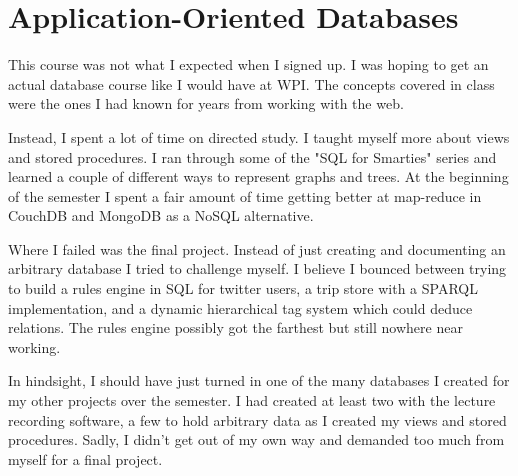 \section{Application-Oriented Databases}

\begin{meta}
\end{meta}

\courseself
This course was not what I expected when I signed up. I was hoping to
get an actual database course like I would have at WPI. The concepts
covered in class were the ones I had known for years from working with
the web.

Instead, I spent a lot of time on directed study. I taught myself more
about views and stored procedures. I ran through some of the "SQL for
Smarties" series and learned a couple of different ways to represent
graphs and trees. At the beginning of the semester I spent a fair amount
of time getting better at map-reduce in CouchDB and MongoDB as a NoSQL
alternative.

Where I failed was the final project. Instead of just creating and
documenting an arbitrary database I tried to challenge myself. I
believe I bounced between trying to build a rules engine in SQL for
twitter users, a trip store with a SPARQL implementation, and a dynamic
hierarchical tag system which could deduce relations. The rules engine
possibly got the farthest but still nowhere near working.

In hindsight, I should have just turned in one of the many databases I
created for my other projects over the semester. I had created at least
two with the lecture recording software, a few to hold arbitrary data as
I created my views and stored procedures. Sadly, I didn't get out of my
own way and demanded too much from myself for a final project.

